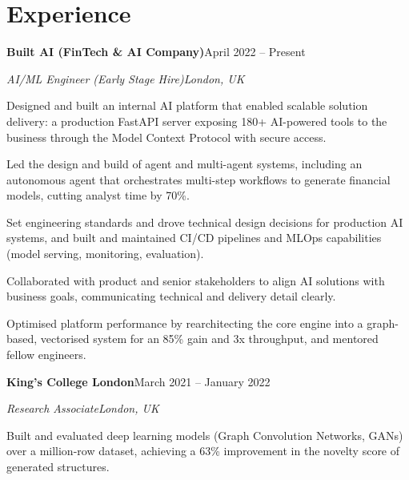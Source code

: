 \documentclass[10pt,a4paper]{article}
\newcommand{\entry}[4]{%
  {\color{company}\bfseries #1}\hfill {\color{muted}#2}\par
  \vspace{1pt}
  {\itshape #3}\hfill {\color{muted}\itshape #4}\par
  \vspace{3pt}%
}
\begin{document}
\section{Experience}
\entry{Built AI (FinTech \& AI Company)}{April 2022 -- Present}{AI/ML Engineer (Early Stage Hire)}{London, UK}
\begin{tight}
  \item Designed and built an internal AI platform that enabled scalable solution delivery: a production FastAPI server exposing 180+ AI-powered tools to the business through the Model Context Protocol with secure access.
  \item Led the design and build of agent and multi-agent systems, including an autonomous agent that orchestrates multi-step workflows to generate financial models, cutting analyst time by 70\%.
  \item Set engineering standards and drove technical design decisions for production AI systems, and built and maintained CI/CD pipelines and MLOps capabilities (model serving, monitoring, evaluation).
  \item Collaborated with product and senior stakeholders to align AI solutions with business goals, communicating technical and delivery detail clearly.
  \item Optimised platform performance by rearchitecting the core engine into a graph-based, vectorised system for an 85\% gain and 3x throughput, and mentored fellow engineers.
\end{tight}

\entry{King's College London}{March 2021 -- January 2022}{Research Associate}{London, UK}
\begin{tight}
  \item Built and evaluated deep learning models (Graph Convolution Networks, GANs) over a million-row dataset, achieving a 63\% improvement in the novelty score of generated structures.
\end{tight}

\end{document}
